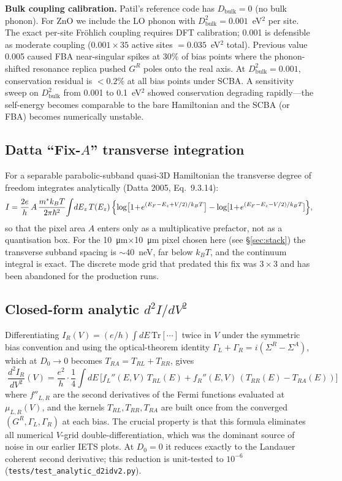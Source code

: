 \documentclass[11pt,a4paper,onecolumn]{article}
\newcommand{\code}[1]{\texttt{\small #1}}
\begin{document}
\textbf{Bulk coupling calibration.} Patil's reference code has $D_{\mathrm{bulk}} = 0$
(no bulk phonon). For ZnO we include the LO phonon with
$D^2_{\mathrm{bulk}} = 0.001$~eV$^2$ per site. The exact per-site
Fr\"ohlich coupling requires DFT calibration; 0.001 is defensible as
moderate coupling ($0.001 \times 35$ active sites $= 0.035$~eV$^2$ total).
Previous value 0.005 caused FBA near-singular spikes at 30\% of bias
points where the phonon-shifted resonance replica pushed $G^R$ poles onto
the real axis. At $D^2_{\mathrm{bulk}} = 0.001$, conservation residual is
$< 0.2\%$ at all bias points under SCBA.
A sensitivity sweep on $D^2_{\mathrm{bulk}}$ from 0.001 to 0.1~eV$^2$ showed
conservation degrading rapidly---the self-energy becomes comparable to the
bare Hamiltonian and the SCBA (or FBA) becomes numerically unstable.

\subsection{Datta ``Fix-$A$'' transverse integration}
\label{sec:method-fixA}
For a separable parabolic-subband quasi-3D Hamiltonian the transverse
degree of freedom integrates analytically (Datta 2005, Eq.~9.3.14):
\begin{equation}
I = \frac{2e}{h}\,A\,\frac{m^* k_B T}{2\pi\hbar^2}
\!\int\! dE_z\, T(E_z)\,\Bigl\{\log\bigl[1\!+\!e^{(E_F - E_z + V/2)/k_BT}\bigr]
- \log[1\!+\!e^{(E_F - E_z - V/2)/k_BT}]\Bigr\},
\end{equation}
so that the pixel area $A$ enters only as a multiplicative prefactor, not
as a quantisation box. For the 10~\si{\um}$\times$10~\si{\um} pixel chosen
here (see \S\ref{sec:stack}) the transverse subband spacing is $\sim 40$~neV,
far below $k_BT$, and the continuum integral is exact. The discrete mode
grid that predated this fix was $3\!\times\!3$ and has been abandoned for
the production runs.

\subsection{Closed-form analytic $d^2I/dV^2$}
Differentiating $I_R(V) = (e/h)\int dE\,\mathrm{Tr}[\cdots]$ twice in $V$
under the symmetric bias convention and using the optical-theorem identity
$\Gamma_L + \Gamma_R = i(\Sigma^R - \Sigma^A)$, which at $D_0 \to 0$ becomes
$T_{RA} = T_{RL} + T_{RR}$, gives
\begin{equation}
\boxed{\;\frac{d^2 I_R}{dV^2}(V) = \frac{e^2}{h}\cdot\frac{1}{4}\!\int dE\,
\bigl[f_L''(E,V)\,T_{RL}(E) + f_R''(E,V)\,(T_{RR}(E) - T_{RA}(E))\bigr]\;}
\label{eq:d2i}
\end{equation}
where $f''_{L,R}$ are the second derivatives of the Fermi functions
evaluated at $\mu_{L,R}(V)$, and the kernels $T_{RL}, T_{RR}, T_{RA}$ are
built once from the converged $(G^R, \Gamma_L, \Gamma_R)$ at each bias.
The crucial property is that this formula eliminates all numerical
$V$-grid double-differentiation, which was the dominant source of noise
in our earlier IETS plots. At $D_0 = 0$ it reduces exactly to the
Landauer coherent second derivative; this reduction is unit-tested to
$10^{-6}$ (\code{tests/test\_analytic\_d2idv2.py}).
\end{document}
